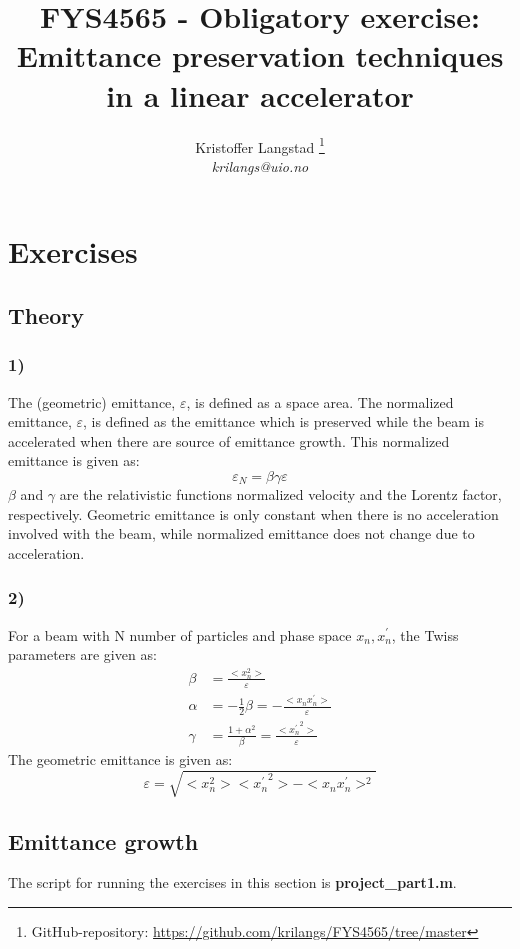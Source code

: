 \documentclass[12pt,a4paper,english]{article}
\title{FYS4565 - Obligatory exercise:\\ Emittance preservation techniques in a linear accelerator}
\date{}
\author{ Kristoffer Langstad \footnote{GitHub-repository: \url{https://github.com/krilangs/FYS4565/tree/master}}\\ \textit{krilangs@uio.no}}
\begin{document}
\maketitle
\section*{Exercises}
\label{sect:Exercises}
\subsection*{Theory}
\label{subsect:Theory}
\subsubsection*{1)}
The (geometric) emittance, $\varepsilon$, is defined as a space area. The normalized emittance, $\varepsilon$, is defined as the emittance which is preserved while the beam is accelerated when there are source of emittance growth. This normalized emittance is given as:
\begin{equation}
\label{eq:norm_em}
\varepsilon_N=\beta\gamma\varepsilon
\end{equation}
$\beta$ and $\gamma$ are the relativistic functions normalized velocity and the Lorentz factor, respectively. Geometric emittance is only constant when there is no acceleration involved with the beam, while normalized emittance does not change due to acceleration.

\subsubsection*{2)}
For a beam with N number of particles and phase space ${x_n,x_n^{\prime}}$, the Twiss parameters are given as:
\begin{align}
\beta &= \frac{<x_n^2>}{\varepsilon}\\
\alpha &= -\frac{1}{2}\beta=-\frac{<x_nx_n^{\prime}>}{\varepsilon}\\
\gamma &= \frac{1+\alpha^2}{\beta}=\frac{<{x_n^{\prime}}^2>}{\varepsilon}
\end{align} 
The geometric emittance is given as:
\begin{equation}
\varepsilon= \sqrt{<x_n^2><{x_n^{\prime}}^2>-<x_nx_n^{\prime}>^2}
\end{equation}

\subsection*{Emittance growth}
\label{subsect:Emittance}
The script for running the exercises in this section is \textbf{project\_part1.m}.
\end{document}
